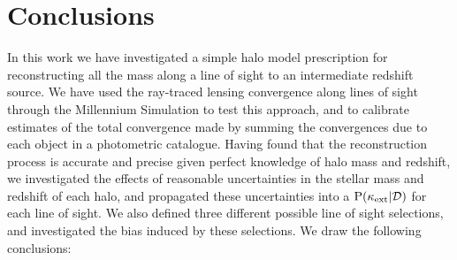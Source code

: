 \documentclass[useAMS,usenatbib]{mn2e}
\begin{document}
\section{Conclusions}
\label{sec:conclude}

In this work we have investigated a simple halo model prescription for
reconstructing all the mass along a line of sight to an intermediate redshift
source. We have used the ray-traced lensing convergence along lines of sight
through the Millennium Simulation to test this approach, and to calibrate
estimates of the total convergence made by summing the convergences due to
each object in a photometric catalogue. Having found that the reconstruction
process is accurate and precise given perfect knowledge of halo mass and redshift, we
investigated the effects of reasonable uncertainties in the stellar mass and
redshift of each halo, and propagated these uncertainties into a
${\rm P}(\kappa_{\rm ext}|{\mathcal{D}})$ for each line of sight. We also defined three different
possible line of sight selections, and investigated the bias induced by these
selections. We draw the following conclusions:
\end{document}

